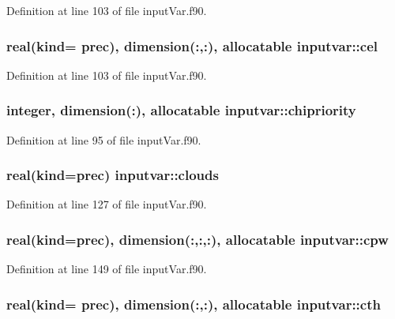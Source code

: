 Definition at line 103 of file input\-Var.\-f90.

\hypertarget{classinputvar_aae07469e8800dce385d02a73306d320c}{
\subsubsection[{cel}]{\setlength{\rightskip}{0pt plus 5cm}real(kind= prec), dimension(\-:,\-:), allocatable inputvar\-::cel}}\label{classinputvar_aae07469e8800dce385d02a73306d320c}


Definition at line 103 of file input\-Var.\-f90.

\hypertarget{classinputvar_a2cb9252c074d0ed99a8ec738dfc04ee2}{
\subsubsection[{chipriority}]{\setlength{\rightskip}{0pt plus 5cm}integer, dimension(\-:), allocatable inputvar\-::chipriority}}\label{classinputvar_a2cb9252c074d0ed99a8ec738dfc04ee2}


Definition at line 95 of file input\-Var.\-f90.

\hypertarget{classinputvar_a20445ed085b01d2d9787297ac8390cd8}{
\subsubsection[{clouds}]{\setlength{\rightskip}{0pt plus 5cm}real(kind=prec) inputvar\-::clouds}}\label{classinputvar_a20445ed085b01d2d9787297ac8390cd8}


Definition at line 127 of file input\-Var.\-f90.

\hypertarget{classinputvar_aa5889e6180140933c4866b2e05765458}{
\subsubsection[{cpw}]{\setlength{\rightskip}{0pt plus 5cm}real(kind=prec), dimension(\-:,\-:,\-:), allocatable inputvar\-::cpw}}\label{classinputvar_aa5889e6180140933c4866b2e05765458}


Definition at line 149 of file input\-Var.\-f90.

\hypertarget{classinputvar_adcb3f28e49daee36d91bc87941f486c9}{
\subsubsection[{cth}]{\setlength{\rightskip}{0pt plus 5cm}real(kind= prec), dimension(\-:,\-:), allocatable inputvar\-::cth}}\label{classinputvar_adcb3f28e49daee36d91bc87941f486c9}


